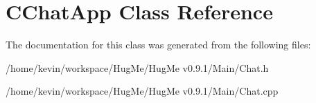 \hypertarget{classCChatApp}{
\section{CChatApp Class Reference}
\label{classCChatApp}
}


The documentation for this class was generated from the following files:\begin{DoxyCompactItemize}
\item 
/home/kevin/workspace/HugMe/HugMe v0.9.1/Main/Chat.h\item 
/home/kevin/workspace/HugMe/HugMe v0.9.1/Main/Chat.cpp\end{DoxyCompactItemize}
